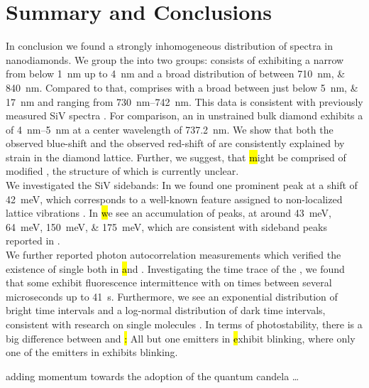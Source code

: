 

 \chapter*{Summary and Conclusions}	\label{ch::conclusion}


   In conclusion we found a strongly inhomogeneous distribution of \siv spectra in nanodiamonds.
   We group the \zpls into two groups:
   \Hl consists of \ZPLs exhibiting a narrow \lw from below \SI{1}{nm} up to \SI{4}{nm} and a broad distribution of \cwl between \SIlist{710;840}{nm}.
   Compared to that, \vl comprises \ZPLs with a broad \lw between just below \SIlist{5; 17}{nm} and \cwl ranging from \SIrange{730}{742}{nm}.
   This data is consistent with previously measured SiV spectra \cite{Benedikter2017a,Neu2012}.
   For comparison, an \siv in unstrained bulk diamond exhibits a \lw of \SIrange{4}{5}{nm} at a center wavelength of \SI{737.2}{nm}\cite{Arend2016a,Dietrich2014}.
   We show that both the observed blue-shift and the observed red-shift of \vl are consistently explained by strain in the diamond lattice.
   Further, we suggest, that \hl might be comprised of modified \sivs, the structure of which is currently unclear.
   \\
   We investigated the SiV sidebands:
   In \vl we found one prominent peak at a shift of \SI{42}{meV}, which corresponds to a well-known feature assigned to non-localized lattice vibrations \cite{Larkins1971,Sternschulte1994}.
   In \hl we see an accumulation of peaks, at around \SIlist{43;64;150;175}{meV}, which are consistent with sideband peaks reported in \cite{Sternschulte1994,Zaitsev2001,Neu2011}.
   \\
   We further reported photon autocorrelation measurements which verified the existence of single \sivs both in \hl and \vl.
   Investigating the time trace of the \siv \pl, we found that some \sivs exhibit fluorescence intermittence with on times between several microseconds up to \SI{41}{s}.
   Furthermore, we see an exponential distribution of bright time intervals and a log-normal distribution of dark time intervals, consistent with research on single molecules \cite{Wong2013}.
   In terms of photostability, there is a big difference between \vl and \hl:
   All but one emitters in \hl exhibit blinking, where only one of the emitters in \vl exhibits blinking.



   adding momentum towards the adoption of the quantum candela \dots
